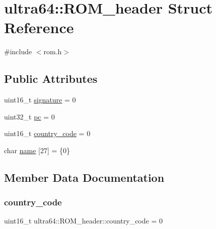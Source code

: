 \hypertarget{structultra64_1_1_r_o_m__header}{}\section{ultra64\+:\+:R\+O\+M\+\_\+header Struct Reference}
\label{structultra64_1_1_r_o_m__header}


{\ttfamily \#include $<$rom.\+h$>$}

\subsection*{Public Attributes}
\begin{DoxyCompactItemize}
\item 
uint16\+\_\+t \hyperlink{structultra64_1_1_r_o_m__header_ab207c693797be7e5788aa7f8bd6dbefa}{signature} = 0
\item 
uint32\+\_\+t \hyperlink{structultra64_1_1_r_o_m__header_a5b7b2660af49b9ce1362631d9ab70faa}{pc} = 0
\item 
uint16\+\_\+t \hyperlink{structultra64_1_1_r_o_m__header_a49c14b788c1df0a13e5b68f3cc642ac0}{country\+\_\+code} = 0
\item 
char \hyperlink{structultra64_1_1_r_o_m__header_a44c2a9d60543f704f83d078d5938ff59}{name} \mbox{[}27\mbox{]} = \{0\}
\end{DoxyCompactItemize}


\subsection{Member Data Documentation}
\mbox{\label{structultra64_1_1_r_o_m__header_a49c14b788c1df0a13e5b68f3cc642ac0}} 
\subsubsection{\texorpdfstring{country\+\_\+code}{country\_code}}
{\footnotesize\ttfamily uint16\+\_\+t ultra64\+::\+R\+O\+M\+\_\+header\+::country\+\_\+code = 0}

\mbox{\label{structultra64_1_1_r_o_m__header_a44c2a9d60543f704f83d078d5938ff59}} 
